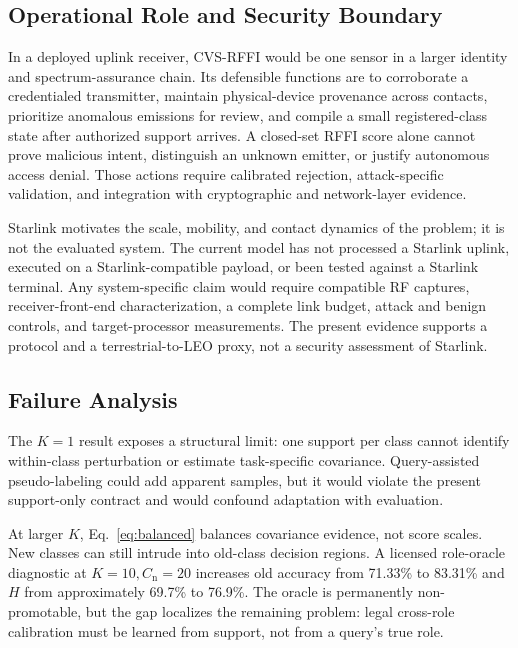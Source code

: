 \documentclass[journal]{IEEEtran}
\newcommand{\method}{CVS-RFFI}
\begin{document}
\subsection{Operational Role and Security Boundary}

In a deployed uplink receiver, \method{} would be one sensor in a larger identity and spectrum-assurance chain. Its defensible functions are to corroborate a credentialed transmitter, maintain physical-device provenance across contacts, prioritize anomalous emissions for review, and compile a small registered-class state after authorized support arrives. A closed-set RFFI score alone cannot prove malicious intent, distinguish an unknown emitter, or justify autonomous access denial. Those actions require calibrated rejection, attack-specific validation, and integration with cryptographic and network-layer evidence.

Starlink motivates the scale, mobility, and contact dynamics of the problem; it is not the evaluated system. The current model has not processed a Starlink uplink, executed on a Starlink-compatible payload, or been tested against a Starlink terminal. Any system-specific claim would require compatible RF captures, receiver-front-end characterization, a complete link budget, attack and benign controls, and target-processor measurements. The present evidence supports a protocol and a terrestrial-to-LEO proxy, not a security assessment of Starlink.

\subsection{Failure Analysis}

The \(K=1\) result exposes a structural limit: one support per class cannot identify within-class perturbation or estimate task-specific covariance. Query-assisted pseudo-labeling could add apparent samples, but it would violate the present support-only contract and would confound adaptation with evaluation.

At larger \(K\), Eq.~\eqref{eq:balanced} balances covariance evidence, not score scales. New classes can still intrude into old-class decision regions. A licensed role-oracle diagnostic at \(K=10,C_{\mathrm{n}}=20\) increases old accuracy from 71.33\% to 83.31\% and \(H\) from approximately 69.7\% to 76.9\%. The oracle is permanently non-promotable, but the gap localizes the remaining problem: legal cross-role calibration must be learned from support, not from a query's true role.
\end{document}
